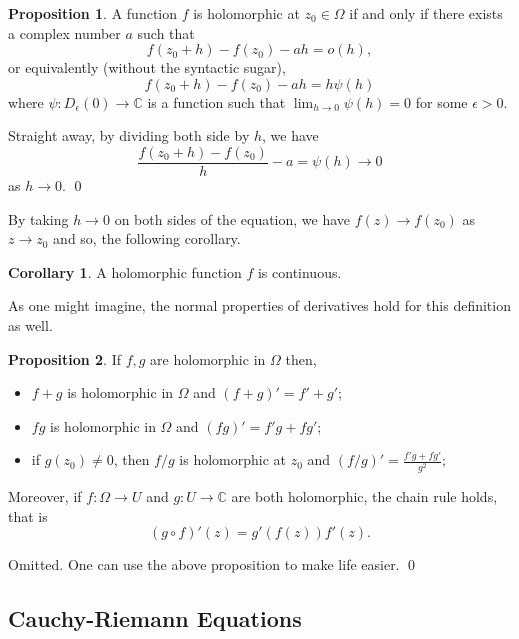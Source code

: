 \documentclass[
]{article}
\theoremstyle{definition}
\newtheorem{prop}{Proposition}
\newtheorem{corollary}{Corollary}[theorem]
\theoremstyle{definition}
\begin{document}
\begin{prop}
  A function \(f\) is holomorphic at \(z_0 \in \Omega\) if and only if there exists 
  a complex number \(a\) such that 
  \[f(z_0 + h) - f(z_0) - ah = o(h),\]
  or equivalently (without the syntactic sugar), 
  \[f(z_0 + h) - f(z_0) - ah = h\psi(h)\]
  where \(\psi : D_\epsilon(0) \to \mathbb{C}\) is a function such that 
  \(\lim_{h \to 0} \psi(h) = 0\) for some \(\epsilon > 0\).
\end{prop}
\proof

Straight away, by dividing both side by \(h\), we have
\[\frac{f(z_0 + h) - f(z_0)}{h} - a = \psi(h) \to 0\] as \(h \to 0\).
\qed

By taking \(h \to 0\) on both sides of the equation, we have
\(f(z) \to f(z_0)\) as \(z \to z_0\) and so, the following corollary.

\begin{corollary}
  A holomorphic function \(f\) is continuous.
\end{corollary}

As one might imagine, the normal properties of derivatives hold for this
definition as well.

\begin{prop}
  If \(f, g\) are holomorphic in \(\Omega\) then, 
  \begin{itemize}
    \item \(f + g\) is holomorphic in \(\Omega\) and \((f + g)' = f' + g'\);
    \item \(fg\) is holomorphic in \(\Omega\) and \((fg)' = f'g + fg'\);
    \item if \(g(z_0) \neq 0\), then \(f / g\) is holomorphic at \(z_0\) and 
    \((f/g)' = \frac{f'g + fg'}{g^2};\)
  \end{itemize}
  Moreover, if \(f : \Omega \to U\) and \(g : U \to \mathbb{C}\) are both holomorphic, 
  the chain rule holds, that is 
  \[(g \circ f)'(z) = g'(f(z))f'(z).\]
\end{prop}
\proof

Omitted. One can use the above proposition to make life easier. \qed

\hypertarget{cauchy-riemann-equations}{%
\subsection{Cauchy-Riemann Equations}\label{cauchy-riemann-equations}}
\end{document}
